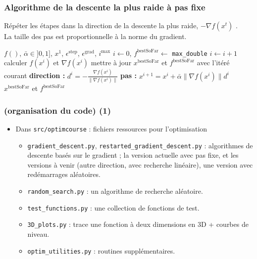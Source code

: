 \documentclass[12pt]{beamer}
\begin{document}
\begin{frame}
\frametitle{Algorithme de la descente la plus raide à pas fixe} 
\vspace{-0.3cm}
Répéter les étapes dans la direction de la descente la plus raide, $-
\nabla f(x^t)$ \cite{cauchy1847methode,curry1944method}. \\
La taille des pas est proportionnelle à la norme du gradient.
\begin{block}{}
\begin{algorithmic}
\REQUIRE $f()$, $\bar\alpha \in ]0,1]$, $x^1$, $\epsilon^{\text{step}}$, $\epsilon^{\text{grad}}$, $i^{\text{max}}$
\STATE $i \leftarrow 0$, $f^{\text{bestSoFar}} \leftarrow$ \texttt{max\_double}
\REPEAT 
\STATE $i \leftarrow i+1$
\STATE calculer $f(x^i)$ et $\nabla f(x^i)$
\STATE mettre à jour $x^{\text{bestSoFar}}$ et $f^{\text{bestSoFar}}$ avec l’itéré courant
\ENDIF
\STATE \textbf{direction : } $d^i = - \frac{\nabla f(x^i)}{\lVert \nabla f(x^i) \rVert}$
\STATE \textbf{pas : } $x^{i+1} = x^i + \bar\alpha \lVert \nabla f(x^i) \rVert d^i$
\RETURN $x^{\text{bestSoFar}}$ et $f^{\text{bestSoFar}}$
\end{algorithmic}
\end{block}
\end{frame}


\begin{frame}
\frametitle{(organisation du code) (1)} 
\vspace{-0.4cm}
\begin{itemize}
\small
\item Dans \texttt{src/optimcourse} : fichiers ressources pour l’optimisation 
\begin{itemize}
\small
\item \texttt{gradient\_descent.py}, \texttt{restarted\_gradient\_descent.py} : algorithmes de descente basés sur le gradient ; la version actuelle avec pas fixe, et les versions à venir (autre direction, avec recherche linéaire), une version avec redémarrages aléatoires.
\item \texttt{random\_search.py} : un algorithme de recherche aléatoire.
\item \texttt{test\_functions.py} : une collection de fonctions de test.
\item \texttt{3D\_plots.py} : trace une fonction à deux dimensions en 3D + courbes de niveau.
\item \texttt{optim\_utilities.py} : routines supplémentaires.
\end{itemize}
\end{itemize}

\end{frame}
\end{document}
